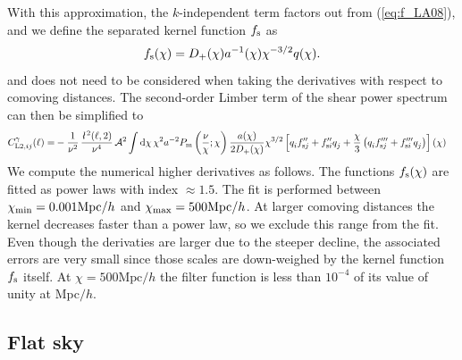 \documentclass[fleqn,usenatbib]{mnras} %
\newcommand{\ellbar}{\hbox{\it \l}\,}
\newcommand{\pref}{{\cal A}}
\begin{document}
With this approximation, the $k$-independent term factors out from
(\ref{eq:f_LA08}), and we define the separated kernel function $f_{\rm s}$ as
%
\begin{equation}
  f_{\rm s}(\chi) = D_+(\chi) a^{-1}(\chi) \chi^{-3/2} q(\chi).
  \label{eq:f_LA08_s}
\end{equation}
%
and does not need to be considered when taking the derivatives with respect to comoving distances.
The second-order Limber term of the shear power spectrum can then be simplified to
%
\begin{align}
  C^\gamma_{{\rm L2}, ij}(\ell) = & - \frac 1 {\nu^2} \, \frac{\ellbar^2(\ell, 2)}{\nu^4} \, \pref^2
    \int {\rm d} \chi \, \chi^{2} a^{-2} P_{\rm m}\left(\frac\nu\chi; \chi\right)
    \frac {a(\chi)}{2 D_+(\chi)} \chi^{3/2}
    \left[ q^{}_i f^{\prime\prime}_{{\rm s} j} + f^{\prime\prime}_{{\rm s}i} q^{}_j
      + \frac{\chi}{3} \left( q^{}_i f^{\prime\prime\prime}_{{\rm s}j} + f^{\prime\prime\prime}_{{\rm s}i} q^{}_j
      \right)
    \right](\chi)
  \label{eq:C_ell_limber2_dr_s}
\end{align}
%
We compute the numerical higher derivatives as follows. The functions $f_{\rm
s}(\chi)$ are fitted as power laws with index $\approx 1.5$. The fit is
performed between $\chi_{\rm min} = 0.001 {\rm Mpc}/h$ and $\chi_{\rm max} =
500 \mbox{Mpc}/h$. At larger comoving distances the kernel decreases faster
than a power law, so we exclude this range from the fit. Even though the
derivaties are larger due to the steeper decline, the associated errors are
very small since those scales are down-weighed by the kernel function $f_{\rm
s}$ itself. At $\chi = 500 \mbox{Mpc}/h$ the filter function is less than
$10^{-4}$ of its value of unity at Mpc$/h$.


\subsection{Flat sky}
\label{sec:Limber_flat_sky}
\end{document}
